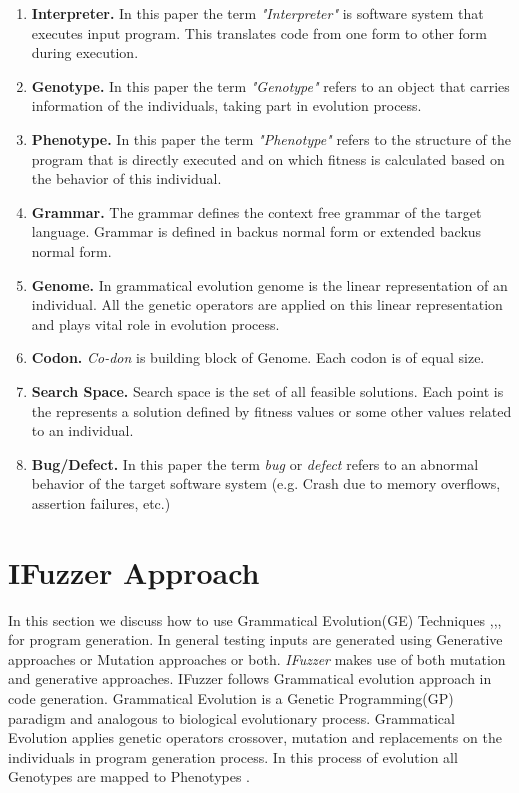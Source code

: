 \documentclass{acm_proc_article-sp}
\begin{document}
\begin{enumerate}
\item{\textbf{Interpreter.}} In this paper the term \textit{"Interpreter"} is software system that executes input program. This translates code from one form to other form during execution. 
\item{\textbf{Genotype.}} In this paper the term \textit{"Genotype"} refers to an  object that carries information of the individuals, taking part in evolution process. 
\item{\textbf{Phenotype.}} In this paper the term \textit{"Phenotype"} refers to the structure of the program that is  directly executed and on which fitness is calculated based on the behavior of this individual.
\item{\textbf{Grammar.}} The grammar defines the context free grammar of the target language. Grammar is defined in backus normal form or extended backus normal form.
\item{\textbf{Genome.}} In grammatical evolution genome is the linear representation of an individual. All the genetic operators are applied on this linear representation and plays vital role in evolution process.
\item{\textbf{Codon.}} \textit{Co-don} is building block of Genome. Each codon is of equal size. 
\item{\textbf{Search Space.}} Search space is the set of all feasible solutions. Each point is the represents a solution defined by fitness values or some other values related to an individual. 
\item{\textbf{Bug/Defect.}} In this paper the term \textit{bug} or \textit{defect} refers to an abnormal behavior of the target software system (e.g. Crash due to memory overflows, assertion failures, etc.) 
\end{enumerate}

\section{IFuzzer Approach} \label{GEIF}
In this section we discuss how to use Grammatical Evolution(GE) Techniques \cite{Ryan98},\cite{Ryan00},\cite{Ryan01},\cite{PoliLM2008} for program generation. In general testing inputs are generated using Generative approaches or Mutation approaches or both. \textit{IFuzzer} makes use of both mutation and generative approaches. IFuzzer follows Grammatical evolution approach in code generation. Grammatical Evolution is a Genetic Programming(GP) paradigm and analogous to biological evolutionary process. Grammatical Evolution applies genetic operators crossover, mutation and replacements on the individuals in program generation process. In this process of evolution all Genotypes are mapped to Phenotypes \cite{Fagan10}. 
\end{document}

